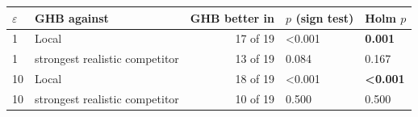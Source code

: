 \begin{tabular}{llrll}
\toprule
$\varepsilon$ & GHB against & GHB better in & $p$ (sign test) & Holm $p$ \\
\midrule
1 & Local & 17 of 19 & <0.001 & \textbf{0.001} \\
1 & strongest realistic competitor & 13 of 19 & 0.084 & 0.167 \\
10 & Local & 18 of 19 & <0.001 & \textbf{<0.001} \\
10 & strongest realistic competitor & 10 of 19 & 0.500 & 0.500 \\
\bottomrule
\end{tabular}
